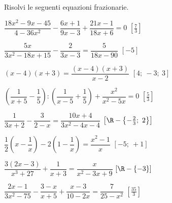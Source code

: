 \begin{esercizio}[*]
\label{ese:20.28}
Risolvi le seguenti equazioni frazionarie.
\begin{enumeratea}
 \item \(\dfrac{18x^{2}-9x-45}{4-36x^{2}}-\dfrac{6x+1}{9x-3}+
        \dfrac{21x-1}{18x+6}=0\) \hfill \(\left[\frac{7}{3}\right]\)
 \item \(\dfrac{5x}{3x^{2}-18x+15}-\dfrac{2}{3x-3}=\dfrac{5}{18x-90}\)
  \hfill \(\left[-5\right]\)
 \item \((x-4)(x+3)=\dfrac{(x-4)(x+3)}{x-2}\)
  \hfill \(\left[4;~-3;~3\right]\)
 \item \(\left(\dfrac{1}{x+5}-\dfrac{1}{5}\right):\left(\dfrac{1}{x-5}+
        \dfrac{1}{5}\right)+\dfrac{x^{2}}{x^{2}-5x}=0\)
  \hfill \(\left[\frac{5}{3}\right]\)
 \item \(\dfrac{1}{3x+2}-\dfrac{3}{2-x}=\dfrac{10x+4}{3x^{2}-4x-4}\)
  \hfill \(\left[\R-\left\{-{\frac{2}{3}};~2\right\}\right]\)
 \item \(\dfrac{1}{2} \left(x-\dfrac{1}{x}\right)-
        2\left(1-\dfrac{1}{x}\right)=\dfrac{x^{2}-1}{x}\)
  \hfill \(\left[-5;~+1\right]\)
 \item \(\dfrac{3(2x-3)}{x^{3}+27}+\dfrac{1}{x+3}=\dfrac{x}{x^{2}-3x+9}\)
  \hfill \(\left[\R-\{-3\}\right]\)
 \item \(\dfrac{2x-1}{3x^{2}-75}-\dfrac{3-x}{x+5}+\dfrac{x-3}{10-2x}=
        \dfrac{7}{25-x^{2}}\)
  \hfill \(\left[\frac{35}{3}\right]\)
\end{enumeratea}
\end{esercizio}

